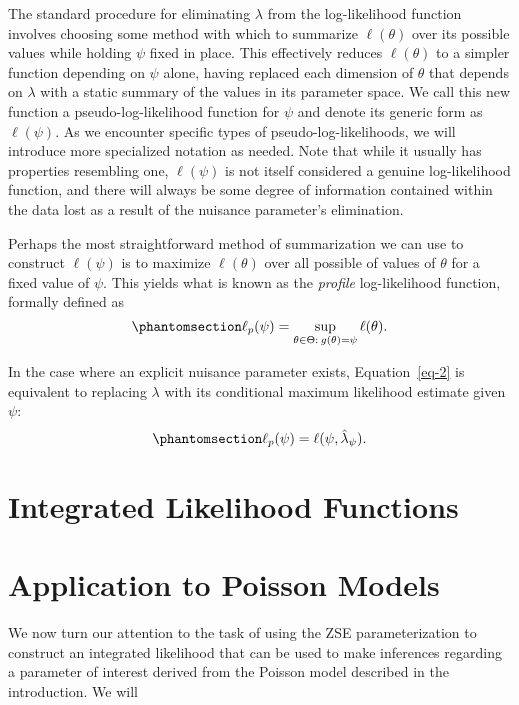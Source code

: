 \documentclass[
  12pt]{article}
\begin{document}
The standard procedure for eliminating \(\lambda\) from the
log-likelihood function involves choosing some method with which to
summarize \(\ell(\theta)\) over its possible values while holding
\(\psi\) fixed in place. This effectively reduces \(\ell(\theta)\) to a
simpler function depending on \(\psi\) alone, having replaced each
dimension of \(\theta\) that depends on \(\lambda\) with a static
summary of the values in its parameter space. We call this new function
a pseudo-log-likelihood function for \(\psi\) and denote its generic
form as \(\ell(\psi)\). As we encounter specific types of
pseudo-log-likelihoods, we will introduce more specialized notation as
needed. Note that while it usually has properties resembling one,
\(\ell(\psi)\) is not itself considered a genuine log-likelihood
function, and there will always be some degree of information contained
within the data lost as a result of the nuisance parameter's
elimination.

Perhaps the most straightforward method of summarization we can use to
construct \(\ell(\psi)\) is to maximize \(\ell(\theta)\) over all
possible of values of \(\theta\) for a fixed value of \(\psi\). This
yields what is known as the \emph{profile} log-likelihood function,
formally defined as \begin{equation}\phantomsection\label{eq-2}{
\ell_p(\psi) = \sup_{\theta \in \Theta: \> g(\theta) = \psi} \ell(\theta).
}\end{equation}

In the case where an explicit nuisance parameter exists,
Equation~\ref{eq-2} is equivalent to replacing \(\lambda\) with its
conditional maximum likelihood estimate given \(\psi\):
\begin{equation}\phantomsection\label{eq-3}{
\ell_p(\psi) = \ell(\psi, \hat{\lambda}_{\psi}).
}\end{equation}

\section{Integrated Likelihood
Functions}\label{integrated-likelihood-functions}

\section{Application to Poisson
Models}\label{application-to-poisson-models}

We now turn our attention to the task of using the ZSE parameterization
to construct an integrated likelihood that can be used to make
inferences regarding a parameter of interest derived from the Poisson
model described in the introduction. We will
\end{document}
